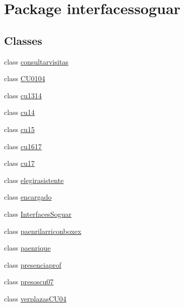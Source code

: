 \hypertarget{namespaceinterfacessoguar}{}\section{Package interfacessoguar}
\label{namespaceinterfacessoguar}
\subsection*{Classes}
\begin{DoxyCompactItemize}
\item 
class \mbox{\hyperlink{classinterfacessoguar_1_1consultarvisitas}{consultarvisitas}}
\item 
class \mbox{\hyperlink{classinterfacessoguar_1_1_c_u0104}{C\+U0104}}
\item 
class \mbox{\hyperlink{classinterfacessoguar_1_1cu1314}{cu1314}}
\item 
class \mbox{\hyperlink{classinterfacessoguar_1_1cu14}{cu14}}
\item 
class \mbox{\hyperlink{classinterfacessoguar_1_1cu15}{cu15}}
\item 
class \mbox{\hyperlink{classinterfacessoguar_1_1cu1617}{cu1617}}
\item 
class \mbox{\hyperlink{classinterfacessoguar_1_1cu17}{cu17}}
\item 
class \mbox{\hyperlink{classinterfacessoguar_1_1elegirasistente}{elegirasistente}}
\item 
class \mbox{\hyperlink{classinterfacessoguar_1_1encargado}{encargado}}
\item 
class \mbox{\hyperlink{classinterfacessoguar_1_1_interfaces_soguar}{Interfaces\+Soguar}}
\item 
class \mbox{\hyperlink{classinterfacessoguar_1_1paenrilarriconboxex}{paenrilarriconboxex}}
\item 
class \mbox{\hyperlink{classinterfacessoguar_1_1paenrique}{paenrique}}
\item 
class \mbox{\hyperlink{classinterfacessoguar_1_1presenciaprof}{presenciaprof}}
\item 
class \mbox{\hyperlink{classinterfacessoguar_1_1presoscu07}{presoscu07}}
\item 
class \mbox{\hyperlink{classinterfacessoguar_1_1verplazas_c_u04}{verplazas\+C\+U04}}
\end{DoxyCompactItemize}
